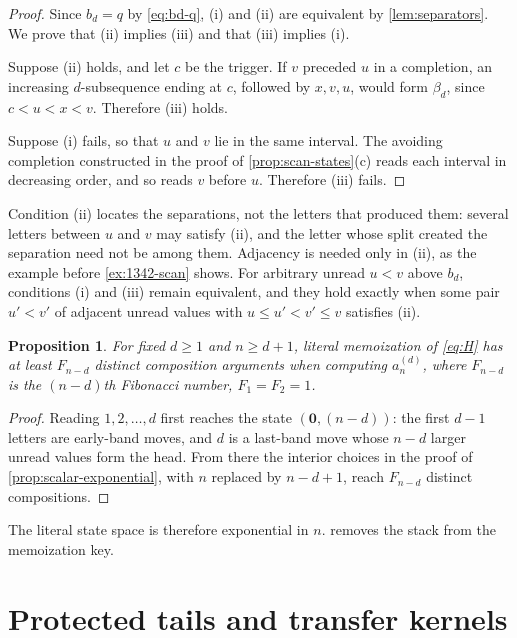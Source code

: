 \documentclass[11pt,reqno]{amsart}
\newtheorem{proposition}[proposition]{Proposition}
\theoremstyle{definition}
\theoremstyle{remark}
\begin{document}
\begin{proof}
Since $b_d=q$ by \eqref{eq:bd-q}, (i) and (ii) are equivalent by
\cref{lem:separators}.  We prove that (ii) implies (iii) and that (iii)
implies (i).

Suppose (ii) holds, and let $c$ be the trigger.  If $v$ preceded $u$ in a
completion, an increasing $d$-subsequence ending at $c$, followed by
$x,v,u$, would form $\beta_d$, since $c<u<x<v$.  Therefore (iii) holds.

Suppose (i) fails, so that $u$ and $v$ lie in the same interval.  The
avoiding completion constructed in the proof of \cref{prop:scan-states}(c)
reads each interval in decreasing order, and so reads $v$ before $u$.
Therefore (iii) fails.
\end{proof}

Condition (ii) locates the separations, not the letters that produced
them: several letters between $u$ and $v$ may satisfy (ii), and the letter
whose split created the separation need not be among them.  Adjacency is
needed only in (ii), as the example before \cref{ex:1342-scan} shows.  For arbitrary unread $u<v$ above $b_d$,
conditions (i) and (iii) remain equivalent, and they hold exactly when some
pair $u'<v'$ of adjacent unread values with $u\leq u'<v'\leq v$ satisfies
(ii).

\begin{proposition}\label{prop:exponential}
For fixed $d\geq1$ and $n\geq d+1$, literal memoization of \eqref{eq:H} has
at least $F_{n-d}$ distinct composition arguments when computing
$a_n^{(d)}$, where $F_{n-d}$ is the $(n-d)$th Fibonacci number,
$F_1=F_2=1$.
\end{proposition}

\begin{proof}
Reading $1,2,\ldots,d$ first reaches the state $(\mathbf0,(n-d))$: the
first $d-1$ letters are early-band moves, and $d$ is a last-band move whose
$n-d$ larger unread values form the head.  From there the interior choices
in the proof of \cref{prop:scalar-exponential}, with $n$ replaced by
$n-d+1$, reach $F_{n-d}$ distinct compositions.
\end{proof}

The literal state space is therefore exponential in $n$.
 removes the stack from the memoization key.

\section{Protected tails and transfer kernels}\label{sec:kernels}
\end{document}
